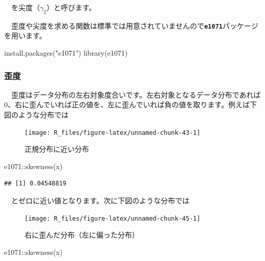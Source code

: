 \documentclass[
  12pt,
]{book}
\newenvironment{Shaded}{\begin{snugshade}}{\end{snugshade}}
\newcommand{\FunctionTok}[1]{\textcolor[rgb]{0.00,0.00,0.00}{#1}}
\newcommand{\NormalTok}[1]{#1}
\newcommand{\SpecialCharTok}[1]{\textcolor[rgb]{0.00,0.00,0.00}{#1}}
\newcommand{\StringTok}[1]{\textcolor[rgb]{0.31,0.60,0.02}{#1}}
\begin{document}
　を尖度（\(\gamma_2\)）と呼びます。

　歪度や尖度を求める関数は標準では用意されていませんので\textbf{\texttt{e1071}}パッケージを用います。

\begin{Shaded}
\begin{Highlighting}[numbers=left,,]
\FunctionTok{install.packages}\NormalTok{(}\StringTok{"e1071"}\NormalTok{)}
\FunctionTok{library}\NormalTok{(e1071)}
\end{Highlighting}
\end{Shaded}

\hypertarget{ux6b6aux5ea6}{%
\subsubsection*{歪度}\label{ux6b6aux5ea6}}

　歪度はデータ分布の左右対象度合いです。左右対象となるデータ分布であれば\(0\)、右に歪んでいれば正の値を、左に歪んでいれば負の値を取ります。例えば下図のような分布では

\begin{figure}[H]

{\centering \texttt{[image: R\_files/figure-latex/unnamed-chunk-43-1]} 

}

\caption{正規分布に近い分布}\label{fig:unnamed-chunk-43}
\end{figure}

\begin{Shaded}
\begin{Highlighting}[numbers=left,,]
\NormalTok{e1071}\SpecialCharTok{::}\FunctionTok{skewness}\NormalTok{(x)}
\end{Highlighting}
\end{Shaded}

\begin{verbatim}
## [1] 0.04548819
\end{verbatim}

　とゼロに近い値となります。次に下図のような分布では

\begin{figure}[H]

{\centering \texttt{[image: R\_files/figure-latex/unnamed-chunk-45-1]} 

}

\caption{右に歪んだ分布（左に偏った分布）}\label{fig:unnamed-chunk-45}
\end{figure}

\begin{Shaded}
\begin{Highlighting}[numbers=left,,]
\NormalTok{e1071}\SpecialCharTok{::}\FunctionTok{skewness}\NormalTok{(x)}
\end{Highlighting}
\end{Shaded}
\end{document}
